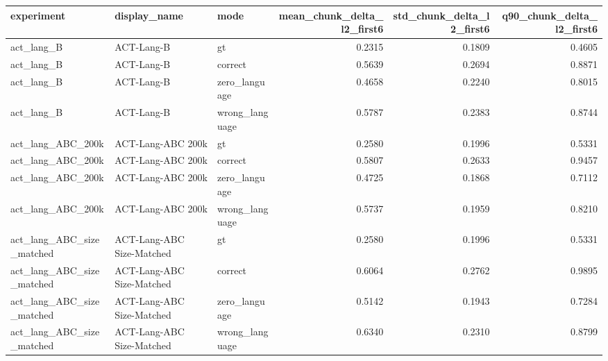 \begin{tabular}{lllrrr}
\toprule
experiment & display\_name & mode & mean\_chunk\_delta\_l2\_first6 & std\_chunk\_delta\_l2\_first6 & q90\_chunk\_delta\_l2\_first6 \\
\midrule
act\_lang\_B & ACT-Lang-B & gt & 0.2315 & 0.1809 & 0.4605 \\
act\_lang\_B & ACT-Lang-B & correct & 0.5639 & 0.2694 & 0.8871 \\
act\_lang\_B & ACT-Lang-B & zero\_language & 0.4658 & 0.2240 & 0.8015 \\
act\_lang\_B & ACT-Lang-B & wrong\_language & 0.5787 & 0.2383 & 0.8744 \\
act\_lang\_ABC\_200k & ACT-Lang-ABC 200k & gt & 0.2580 & 0.1996 & 0.5331 \\
act\_lang\_ABC\_200k & ACT-Lang-ABC 200k & correct & 0.5807 & 0.2633 & 0.9457 \\
act\_lang\_ABC\_200k & ACT-Lang-ABC 200k & zero\_language & 0.4725 & 0.1868 & 0.7112 \\
act\_lang\_ABC\_200k & ACT-Lang-ABC 200k & wrong\_language & 0.5737 & 0.1959 & 0.8210 \\
act\_lang\_ABC\_size\_matched & ACT-Lang-ABC Size-Matched & gt & 0.2580 & 0.1996 & 0.5331 \\
act\_lang\_ABC\_size\_matched & ACT-Lang-ABC Size-Matched & correct & 0.6064 & 0.2762 & 0.9895 \\
act\_lang\_ABC\_size\_matched & ACT-Lang-ABC Size-Matched & zero\_language & 0.5142 & 0.1943 & 0.7284 \\
act\_lang\_ABC\_size\_matched & ACT-Lang-ABC Size-Matched & wrong\_language & 0.6340 & 0.2310 & 0.8799 \\
\bottomrule
\end{tabular}
